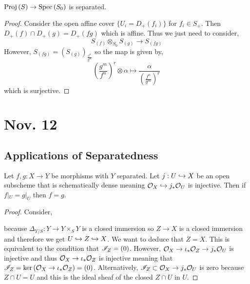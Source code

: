 \documentclass[12pt]{article}
\begin{document}
\begin{prop}
$\mathrm{Proj}\left( S \right) \to \mathrm{Spec}\left( S_0 \right)$ is separated.
\end{prop}

\begin{proof}
Consider the open affine cover $\{ U_i = D_+(f_i) \}$ for $f_i \in S_+$. Then $D_+(f) \cap D_+(g) = D_+(fg)$ which is affine. Thus we just need to consider,
\[ S_{(f)} \otimes_{S_0} S_{(g)} \to S_{(fg)} \]
However, $S_{(fg)} = (S_{(g)})_{\frac{f^n}{g^m}}$ so the map is given by,
\[ \left( \frac{g^m}{f^n} \right)^r \otimes \alpha \mapsto \frac{\alpha}{\left( \frac{f^n}{g^m} \right)^r} \]
which is surjective.
\end{proof}

\section{Nov. 12}

\subsection{Applications of Separatedness}

\begin{prop}
Let $f, g : X \to Y$ be morphisms with $Y$ separated. Let $j : U \hookrightarrow X$ be an open subscheme that is schematically dense meaning $\mathcal{O}_{X} \hookrightarrow j_* \mathcal{O}_{U}$ is injective. Then if $f|_U = g|_U$ then $f = g$.
\end{prop}

\begin{proof}
Consider,
\begin{center}
\end{center}
because $\Delta_{Y/S} : Y \to Y \times_S Y$ is a closed immersion so $Z \to X$ is a closed immersion and therefore we get $U \hookrightarrow Z \hookrightarrow X$. We want to deduce that $Z = X$. This is equivalent to the condition that $\mathscr{I}_Z = (0)$. However, $\mathcal{O}_{X} \to \iota_* \mathcal{O}_{Z} \to j_* \mathcal{O}_{U}$ is injective and thus $\mathcal{O}_{X} \to \iota_* \mathcal{O}_{Z}$ is injective meaning that $\mathscr{I}_Z = \ker{(\mathcal{O}_{X} \to \iota_* \mathcal{O}_{Z})} = (0)$. Alternatively, $\mathscr{I}_Z \subset \mathcal{O}_{X} \to j_* \mathcal{O}_{U}$ is zero because $Z \cap U = U$ and this is the ideal sheaf of the closed $Z \cap U$ in $U$.
\end{proof}
\end{document}
